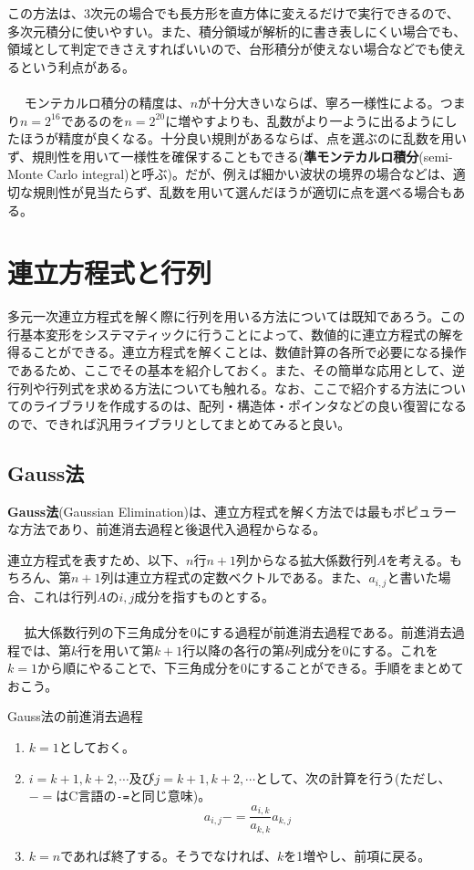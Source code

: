 この方法は、3次元の場合でも長方形を直方体に変えるだけで実行できるので、多次元積分に使いやすい。また、積分領域が解析的に書き表しにくい場合でも、領域として判定できさえすればいいので、台形積分が使えない場合などでも使えるという利点がある。
\\ \\　
モンテカルロ積分の精度は、$n$が十分大きいならば、寧ろ一様性による。つまり$n=2^{16}$であるのを$n=2^{20}$に増やすよりも、乱数がより一ように出るようにしたほうが精度が良くなる。十分良い規則があるならば、点を選ぶのに乱数を用いず、規則性を用いて一様性を確保することもできる(\textbf{準モンテカルロ積分}(semi-Monte Carlo integral)と呼ぶ)。だが、例えば細かい波状の境界の場合などは、適切な規則性が見当たらず、乱数を用いて選んだほうが適切に点を選べる場合もある。

\section{連立方程式と行列}
多元一次連立方程式を解く際に行列を用いる方法については既知であろう。この行基本変形をシステマティックに行うことによって、数値的に連立方程式の解を得ることができる。連立方程式を解くことは、数値計算の各所で必要になる操作であるため、ここでその基本を紹介しておく。また、その簡単な応用として、逆行列や行列式を求める方法についても触れる。なお、ここで紹介する方法についてのライブラリを作成するのは、配列・構造体・ポインタなどの良い復習になるので、できれば汎用ライブラリとしてまとめてみると良い。
\subsection{Gauss法}
\textbf{Gauss法}(Gaussian Elimination)は、連立方程式を解く方法では最もポピュラーな方法であり、前進消去過程と後退代入過程からなる。

連立方程式を表すため、以下、$n$行$n+1$列からなる拡大係数行列$A$を考える。もちろん、第$n+1$列は連立方程式の定数ベクトルである。また、$a_{i,j}$と書いた場合、これは行列$A$の$i,j$成分を指すものとする。
\\ \\　
拡大係数行列の下三角成分を0にする過程が前進消去過程である。前進消去過程では、第$k$行を用いて第$k+1$行以降の各行の第$k$列成分を0にする。これを$k=1$から順にやることで、下三角成分を0にすることができる。手順をまとめておこう。
\begin{itembox}[l]{Gauss法の前進消去過程}
\begin{enumerate}
\item $k=1$としておく。
\item $i=k+1,k+2,\cdots$及び$j=k+1,k+2,\cdots$として、次の計算を行う(ただし、$-=$はC言語の\verb|-=|と同じ意味)。
\begin{equation}
a_{i,j}-=\frac{a_{i,k}}{a_{k,k}}a_{k,j} \label{gauss1}
\end{equation}
\item $k=n$であれば終了する。そうでなければ、$k$を1増やし、前項に戻る。
\end{enumerate}
\end{itembox}

